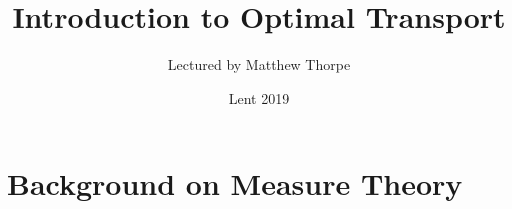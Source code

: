 \documentclass[10pt,a4paper]{article}
\newcommand{\latinmodern}[1]{{\fontfamily{lmss}\selectfont
\textbf{#1}
}}
\DeclarePairedDelimiter\bignorm{\lVert}{\rVert}
\newcommand{\doublerule}[1][.4pt]{%
  \noindent
  \makebox[0pt][l]{\rule[.7ex]{\linewidth}{#1}}%
  \rule[.3ex]{\linewidth}{#1}}
\begin{document}
\title{Introduction to Optimal Transport}
\author{Lectured by Matthew Thorpe}
\date{Lent 2019}

\maketitle

\newcommand{\statement}[1]{\latinmodern{\textbf{#1)}}}

\newcommand{\thm}{\statement{Theorem}}
\newcommand{\thmnum}[1]{\statement{Theorem #1}}
\newcommand{\defi}{\statement{Definition}}
\newcommand{\definum}[1]{\statement{Definition #1}}
\newcommand{\lem}{\statement{Lemma}}
\newcommand{\lemnum}[1]{\statement{Lemma #1}}
\newcommand{\prop}{\statement{Proposition}}
\newcommand{\propnum}[1]{\statement{Proposition #1}}
\newcommand{\corr}{\statement{Corollary}}
\newcommand{\corrnum}[1]{\statement{Corollary #1}}
\newcommand{\pf}{\textbf{proof) }}

\newcommand{\norms}[2]{\bignorm[\big]{#1}_{#2}}
\newcommand{\snorms}[2]{\bignorm[\small]{#1}_{#2}}
\newcommand{\charac}{\bm{1}}
\newcommand{\wa}[1]{ d_{ \mathrel{\scalebox{0.5}[0.5]{$W$}}^{#1}}}

\newcommand{\lap}{\triangle} %
\newcommand{\s}{\vspace{10pt}}
\newcommand{\bull}{$\bullet$}
\newcommand{\sta}{$\star$}
\newcommand{\reals}{\mathbb{R}}

\newcommand{\eop}{\hfill  \textsl{(End of proof)} $\square$} %
\newcommand{\eos}{\hfill  \textsl{(End of statement)} $\square$} %

\newcommand{\call}[1]{\quad \cdots\cdots\cdots\,\,(#1)}

\newcommand{\intN}{\mathbb{Z}_N}
\newcommand{\nat}{\mathbb{N}}
\newcommand{\abs}[1]{\big| #1 \big|}
\newcommand{\avg}{\mathbb{E}}
\newcommand{\prob}{\mathbb{P}}
\newcommand{\borel}{\mathscr{B}}
\newcommand{\EE}{\mathscr{E}}
\newcommand{\pa}{\partial}
\newcommand{\PP}{\mathscr{P}}
\newcommand{\pgi}{\text{P}_{\text{GI}}}

\renewcommand{\vec}{\underline}
\renewcommand{\bar}{\overline}

\def\doubleunderline#1{\underline{\underline{#1}}}

\newcommand{\newday}{\doublerule[0.5pt]}

\setlength\parindent{0pt}

\section{Background on Measure Theory}
\end{document}
